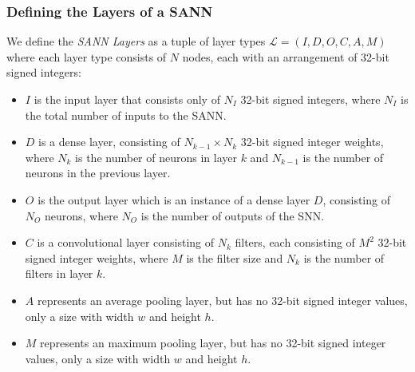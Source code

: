 \subsubsection{Defining the Layers of a \ac{SANN}}

\begin{definition}
	\label{def:layer}We define the \emph{\ac{SANN} Layers} as a tuple of layer types $\mathcal{L} = (I, D, O, C, A, M)$ where each layer type consists of $N$ nodes, each with an arrangement of 32-bit signed integers:
	\begin{itemize}
		\item $I$ is the input layer that consists only of $N_I$ 32-bit signed integers, where $N_I$ is the total number of inputs to the \ac{SANN}.
		\item $D$ is a dense layer, consisting of $N_{k-1} \times N_k$ 32-bit signed integer weights, where $N_k$ is the number of neurons in layer $k$ and $N_{k-1}$ is the number of neurons in the previous layer.
		\item $O$ is the output layer which is an instance of a dense layer $D$, consisting of $N_O$ neurons, where $N_O$ is the number of outputs of the \ac{SNN}.
		\item $C$ is a convolutional layer consisting of $N_k$ filters, each consisting of $M^2$ 32-bit signed integer weights, where $M$ is the filter size and $N_k$ is the number of filters in layer $k$.
		\item $A$ represents an average pooling layer, but has no 32-bit signed integer values, only a size with width $w$ and height $h$.
		\item $M$ represents an maximum pooling layer, but has no 32-bit signed integer values, only a size with width $w$ and height $h$.
	\end{itemize}
\end{definition}

